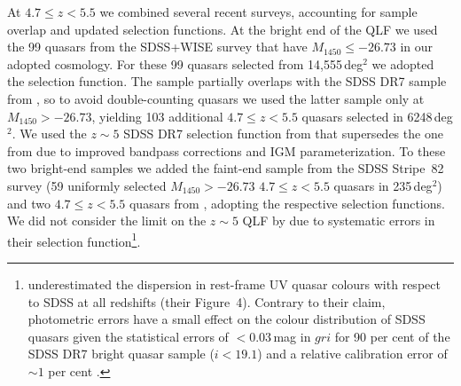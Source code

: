\documentclass[fleqn,usenatbib]{mnras}
\begin{document}
At $4.7\le z<5.5$ we combined several recent surveys, accounting for
sample overlap and updated selection functions. At the bright end of
the QLF we used the 99 quasars from the SDSS+WISE survey
\citep{2016ApJ...829...33Y} that have $M_{1450}\le -26.73$ in our adopted
cosmology.  For these 99 quasars selected from 14,555\,deg$^2$ we
adopted the \citet{2016ApJ...829...33Y} selection function.  The
\citet{2016ApJ...829...33Y} sample partially overlaps with the SDSS
DR7 sample from \citet{2013ApJ...768..105M}, so to avoid
double-counting quasars we used the latter sample only at
$M_{1450}>-26.73$, yielding 103 additional $4.7\le z<5.5$ quasars selected in
6248\,deg$^2$. We used the $z\sim 5$ SDSS DR7 selection function from
\citet{2013ApJ...768..105M} that supersedes the one from
\citet{2006AJ....131.2766R} due to improved bandpass corrections and IGM
parameterization.  To these two bright-end samples we added the
faint-end sample from the \citet{2013ApJ...768..105M} SDSS Stripe~82
survey (59 uniformly selected $M_{1450}>-26.73$ $4.7\le z<5.5$ quasars in 235\,deg$^2$)
and two $4.7\le z<5.5$ quasars from \citet{2011ApJ...728L..26G},
adopting the respective selection functions.  We did not consider the
limit on the $z\sim 5$ QLF by \citet{2012ApJ...756..160I} due to
systematic errors in their selection
function\footnote{\citet{2012ApJ...756..160I} underestimated the
  dispersion in rest-frame UV quasar colours with respect to SDSS at
  all redshifts (their Figure~4). Contrary to their claim, photometric
  errors have a small effect on the colour distribution of SDSS
  quasars given the statistical errors of $<0.03$\,mag in $gri$ for 90
  per cent of the SDSS DR7 bright quasar sample ($i<19.1$) and a
  relative calibration error of $\sim 1$ per cent
  \citep{2008ApJ...674.1217P}.}.
\end{document}
